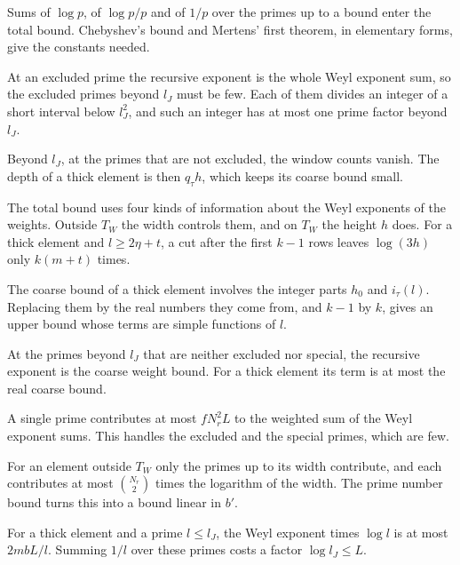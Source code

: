 Sums of $\log p$, of $\log p/p$ and of $1/p$ over the primes up to a bound enter the total bound.
Chebyshev's bound and Mertens' first theorem, in elementary forms, give the constants needed.

At an excluded prime the recursive exponent is the whole Weyl exponent sum, so the excluded primes
beyond $l_J$ must be few. Each of them divides an integer of a short interval below $l_J^2$, and such
an integer has at most one prime factor beyond $l_J$.

Beyond $l_J$, at the primes that are not excluded, the window counts vanish. The depth of a thick
element is then $q_\tau h$, which keeps its coarse bound small.

The total bound uses four kinds of information about the Weyl exponents of the weights. Outside $T_W$
the width controls them, and on $T_W$ the height $h$ does. For a thick element and $l\geq2\eta+t$, a cut
after the first $k-1$ rows leaves $\log(3h)$ only $k(m+t)$ times.

The coarse bound of a thick element involves the integer parts $h_0$ and $i_\tau(l)$. Replacing them by
the real numbers they come from, and $k-1$ by $k$, gives an upper bound whose terms are simple
functions of $l$.

At the primes beyond $l_J$ that are neither excluded nor special, the recursive exponent is the coarse
weight bound. For a thick element its term is at most the real coarse bound.

A single prime contributes at most $fN_r^2L$ to the weighted sum of the Weyl exponent sums. This
handles the excluded and the special primes, which are few.

For an element outside $T_W$ only the primes up to its width contribute, and each contributes at most
$\binom{N_r}2$ times the logarithm of the width. The prime number bound turns this into a bound linear
in $b'$.

For a thick element and a prime $l\le l_J$, the Weyl exponent times $\log l$ is at most $2mbL/l$.
Summing $1/l$ over these primes costs a factor $\log l_J\le L$.

